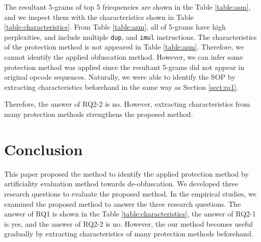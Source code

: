 \documentclass[conference]{IEEEtran}
\begin{document}
The resultant 5-grams of top 5 friequencies are shown in the Table
\ref{table:asm}, and we inspect them with the characteristics shown in
Table \ref{table:characteristics}.  From Table \ref{table:asm}, all of
5-grams have high perplexities, and include multiple \texttt{dup}, and
\texttt{imul} instructions.  The characteristics of the protection
method is not appeared in Table \ref{table:asm}.  Therefore, we cannot
identify the applied obfuscation method.
%
However, we can infer some protection method was applied since the
resultant 5-grams did not appear in original opcode sequences.
%
Naturally, we were able to identify the SOP by extracting
characteristics beforehand in the same way as Section \ref{sect:rq1}.

Therefore, the answer of RQ2-2 is no. However, extracting
characteristics from many protection methods strengthens the proposed
method.

% 
% 
% 


\section{Conclusion}\label{sect:conclusion}

This paper proposed the method to identify the applied protection
method by artificiality evaluation method towards de-obfuscation.  We
developed three research questions to evaluate the proposed method.
In the empirical studies, we examined the proposed method to answer
the three research questions.  The answer of RQ1 is shown in the
Table \ref{table:characteristics}, the answer of RQ2-1 is yes, and the
answer of RQ2-2 is no.  However, the our method becomes useful
gradually by extracting characteristics of many protection methods
beforehand.
\end{document}

